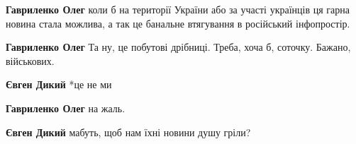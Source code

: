 \begin{itemize}
\begin{itemize}
\begin{itemize}
 
\textbf{Гавриленко Олег} коли б на території України або за участі українців ця гарна новина стала можлива, а так це банальне втягування в російський інфопростір.

 
\textbf{Гавриленко Олег} Та ну, це побутові дрібниці. Треба, хоча б, соточку. Бажано, військових.
\end{itemize}

 
\textbf{Євген Дикий} *це не ми

\begin{itemize}
 
\textbf{Гавриленко Олег} на жаль.
\end{itemize}

 
\textbf{Євген Дикий} мабуть, щоб нам їхні новини душу гріли?

\begin{itemize}
 

\end{itemize}
\end{itemize}
\end{itemize}
